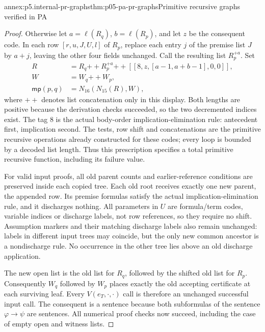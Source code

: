 \begin{annexitem}{annex:p5.internal-pr-graphs}{thm:p05-pa-pr-graphs}{Primitive recursive graphs verified in PA}
\begin{proof}
Otherwise let \(a=\ell(R_q)\), \(b=\ell(R_p)\), and let \(z\)
be the consequent code.  In each row \([r,u,J,U,l]\) of \(R_p\),
replace each entry \(j\) of the premise list \(J\) by \(a+j\),
leaving the other four fields unchanged.  Call the resulting list
\(R_p^{+a}\).  Set
\[
\begin{aligned}
 R&=R_q\mathbin{+\!+}R_p^{+a}\mathbin{+\!+}
          [[8,z,[a-1,a+b-1],0,0]],\\
 W&=W_q\mathbin{+\!+}W_p,\\
 \mathsf{mp}(p,q)&=N_{16}(N_{15}(R),W),
\end{aligned}
\]
where \(+\!+\) denotes list concatenation only in this display.
Both lengths are positive because the derivation checks succeeded, so the
two decremented indices exist.  The tag \(8\) is the actual body-order
implication-elimination rule: antecedent first, implication second.
The tests, row shift and concatenations are the primitive recursive
operations already constructed for these codes; every loop is bounded by a
decoded list length.  Thus this prescription specifies a total primitive
recursive function, including its failure value.

For valid input proofs, all old parent counts and earlier-reference conditions
are preserved inside each copied tree.  Each old root receives exactly one
new parent, the appended row.  Its premise formulas satisfy the actual
implication-elimination rule, and it discharges nothing.  All parameters
in \(U\) are formula/term codes, variable indices or discharge labels,
not row references, so they require no shift.  Assumption markers and their
matching discharge labels also remain unchanged: labels in different input
trees may coincide, but the only new common ancestor is a nondischarge rule.
No occurrence in the other tree lies above an old discharge application.

The new open list is the old list for \(R_q\), followed by the shifted
old list for \(R_p\).  Consequently \(W_q\) followed by \(W_p\)
places exactly the old accepting certificate at each surviving leaf.
Every \(V(e_T,\cdot,\cdot)\) call is therefore an unchanged successful
input call.  The consequent is a sentence because both subformulas of the
sentence \(\varphi\to\psi\) are sentences.  All numerical proof checks
now succeed, including the case of empty open and witness lists.
\end{proof}
\end{annexitem}

